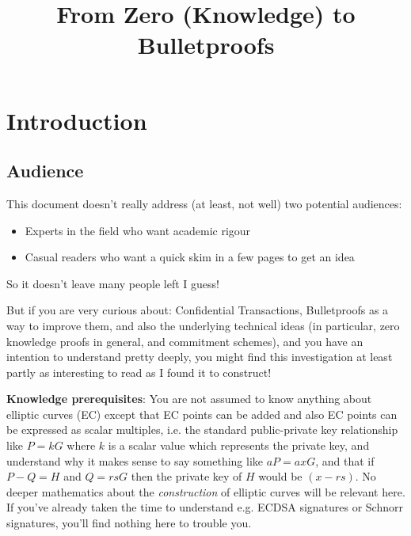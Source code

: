 \documentclass[10pt,a4paper]{article}
\providecommand{\tightlist}{%
  \setlength{\itemsep}{0pt}\setlength{\parskip}{0pt}}
\begin{document}
\title{From Zero (Knowledge) to Bulletproofs}
\maketitle


\hypertarget{introduction}{%
\section[Introduction]{\texorpdfstring{\protect\hypertarget{anchor}{}{}Introduction}{Introduction}}\label{introduction}}

\hypertarget{audience}{%
\subsection[Audience]{\texorpdfstring{\protect\hypertarget{anchor-1}{}{}Audience}{Audience}}\label{audience}}

This document doesn't really address (at least, not well) two potential
audiences:

\begin{itemize}
\tightlist
\item
  Experts in the field who want academic rigour
\item
  Casual readers who want a quick skim in a few pages to get an idea
\end{itemize}

So it doesn't leave many people left I guess!

But if you are very curious about: Confidential Transactions,
Bulletproofs as a way to improve them, and also the underlying technical
ideas (in particular, zero knowledge proofs in general, and commitment
schemes), and you have an intention to understand pretty deeply, you
might find this investigation at least partly as interesting to read as
I found it to construct!

\textbf{Knowledge prerequisites}: You are not assumed to know anything
about elliptic curves (EC) except that EC points can be added and also EC points 
can be expressed as scalar multiples, i.e. the standard public-private key relationship like
$P=kG$ where $k$ is a scalar value which represents the private key, and understand why it
makes sense to say something like $aP = axG$, and that if $P-Q=H$ and $Q=rsG$ then the private key
of $H$ would be $(x-rs)$. No deeper mathematics about the \emph{construction} of
elliptic curves will be relevant here. If you've already taken the time
to understand e.g. ECDSA signatures or Schnorr signatures, you'll find
nothing here to trouble you.
\end{document}
